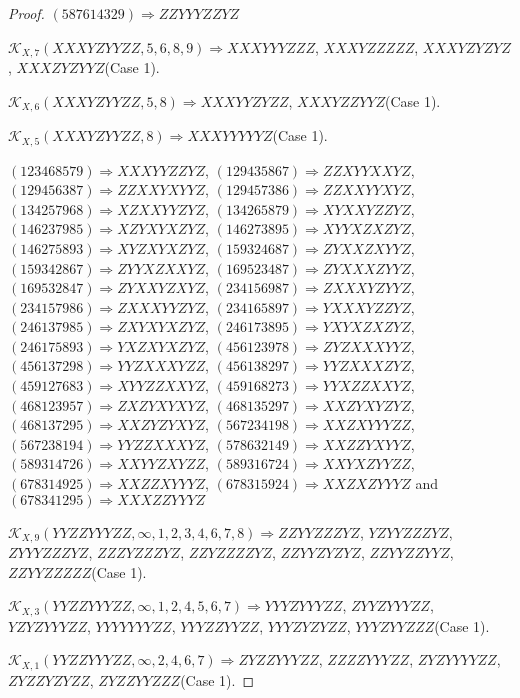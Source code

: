 \documentclass[12pt]{article}
\theoremstyle{plain}
\theoremstyle{definition}
\theoremstyle{remark}
\newcommand{\fancy}[1]{\mathcal{#1}}
\def\K{\fancy{K}}
\begin{document}
\begin{proof}
	$(5 8 7 6 1 4 3 2 9)\Rightarrow ZZYYYZZYZ$
	
	
	$\K_{X,7}(XXXYZYYZZ,5, 6, 8, 9)\Rightarrow $$XXXYYYZZZ$, $XXXYZZZZZ$, $XXXYZYZYZ$, $XXXZYZYYZ$(Case 1).
	
	$\K_{X,6}(XXXYZYYZZ,5, 8)\Rightarrow $$XXXYYZYZZ$, $XXXYZZYYZ$(Case 1).
	
	$\K_{X,5}(XXXYZYYZZ,8)\Rightarrow $$XXXYYYYYZ$(Case 1).
	
	
	
	$(1 2 3 4 6 8 5 7 9)\Rightarrow XXXYYZZYZ$, $(1 2 9 4 3 5 8 6 7)\Rightarrow ZZXYYXXYZ$, $(1 2 9 4 5 6 3 8 7)\Rightarrow ZZXXYXYYZ$, $(1 2 9 4 5 7 3 8 6)\Rightarrow ZZXXYYXYZ$, $(1 3 4 2 5 7 9 6 8)\Rightarrow XZXXYYZYZ$, $(1 3 4 2 6 5 8 7 9)\Rightarrow XYXXYZZYZ$, $(1 4 6 2 3 7 9 8 5)\Rightarrow XZYXYXZYZ$, $(1 4 6 2 7 3 8 9 5)\Rightarrow XYYXZXZYZ$, $(1 4 6 2 7 5 8 9 3)\Rightarrow XYZXYXZYZ$, $(1 5 9 3 2 4 6 8 7)\Rightarrow ZYXXZXYYZ$, $(1 5 9 3 4 2 8 6 7)\Rightarrow ZYYXZXXYZ$, $(1 6 9 5 2 3 4 8 7)\Rightarrow ZYXXXZYYZ$, $(1 6 9 5 3 2 8 4 7)\Rightarrow ZYXXYZXYZ$, $(2 3 4 1 5 6 9 8 7)\Rightarrow ZXXXYZYYZ$, $(2 3 4 1 5 7 9 8 6)\Rightarrow ZXXXYYZYZ$, $(2 3 4 1 6 5 8 9 7)\Rightarrow YXXXYZZYZ$, $(2 4 6 1 3 7 9 8 5)\Rightarrow ZXYXYXZYZ$, $(2 4 6 1 7 3 8 9 5)\Rightarrow YXYXZXZYZ$, $(2 4 6 1 7 5 8 9 3)\Rightarrow YXZXYXZYZ$, $(4 5 6 1 2 3 9 7 8)\Rightarrow ZYZXXXYYZ$, $(4 5 6 1 3 7 2 9 8)\Rightarrow YYZXXXYZZ$, $(4 5 6 1 3 8 2 9 7)\Rightarrow YYZXXXZYZ$, $(4 5 9 1 2 7 6 8 3)\Rightarrow XYYZZXXYZ$, $(4 5 9 1 6 8 2 7 3)\Rightarrow YYXZZXXYZ$, $(4 6 8 1 2 3 9 5 7)\Rightarrow ZXZYXYXYZ$, $(4 6 8 1 3 5 2 9 7)\Rightarrow XXZYXYZYZ$, $(4 6 8 1 3 7 2 9 5)\Rightarrow XXZYZYXYZ$, $(5 6 7 2 3 4 1 9 8)\Rightarrow XXZXYYYZZ$, $(5 6 7 2 3 8 1 9 4)\Rightarrow YYZZXXXYZ$, $(5 7 8 6 3 2 1 4 9)\Rightarrow XXZZYXYYZ$, $(5 8 9 3 1 4 7 2 6)\Rightarrow XXYYZXYZZ$, $(5 8 9 3 1 6 7 2 4)\Rightarrow XXYXZYYZZ$, $(6 7 8 3 1 4 9 2 5)\Rightarrow XXZZXYYYZ$, $(6 7 8 3 1 5 9 2 4)\Rightarrow XXZXZYYYZ$ and $(6 7 8 3 4 1 2 9 5)\Rightarrow XXXZZYYYZ$
	
	
	$\K_{X,9}(YYZZYYYZZ,\infty,1, 2, 3, 4, 6, 7, 8)\Rightarrow $$ZZYYZZZYZ$, $YZYYZZZYZ$, $ZYYYZZZYZ$, $ZZZYZZZYZ$, $ZZYZZZZYZ$, $ZZYYZYZYZ$, $ZZYYZZYYZ$, $ZZYYZZZZZ$(Case 1).
	
	$\K_{X,3}(YYZZYYYZZ,\infty,1, 2, 4, 5, 6, 7)\Rightarrow $$YYYZYYYZZ$, $ZYYZYYYZZ$, $YZYZYYYZZ$, $YYYYYYYZZ$, $YYYZZYYZZ$, $YYYZYZYZZ$, $YYYZYYZZZ$(Case 1).
	
	$\K_{X,1}(YYZZYYYZZ,\infty,2, 4, 6, 7)\Rightarrow $$ZYZZYYYZZ$, $ZZZZYYYZZ$, $ZYZYYYYZZ$, $ZYZZYZYZZ$, $ZYZZYYZZZ$(Case 1).
	

\end{proof}
\end{document}
